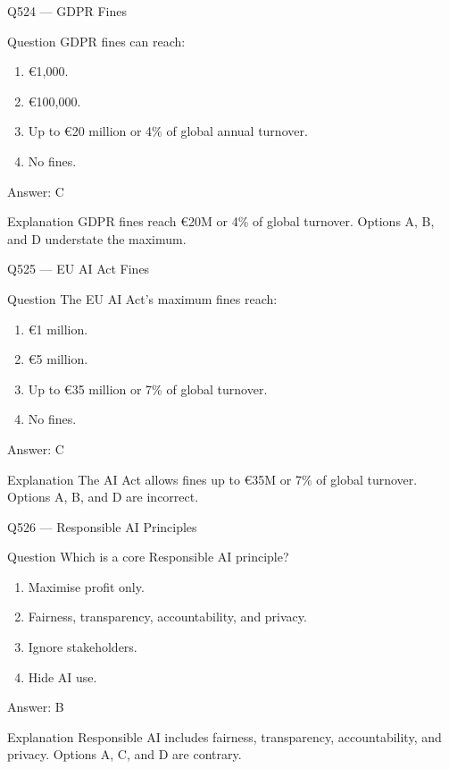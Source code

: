 \documentclass[aspectratio=169,8pt]{beamer}
\begin{document}
	\begin{frame}{Q524 --- GDPR Fines}
		\begin{block}{Question}
			GDPR fines can reach:
			\begin{enumerate}
				\item €1,000.
				\item €100,000.
				\item Up to €20 million or 4\% of global annual turnover.
				\item No fines.
			\end{enumerate}
		\end{block}
		\begin{exampleblock}{Answer: C}\end{exampleblock}
		\begin{block}{Explanation}
			GDPR fines reach €20M or 4\% of global turnover. Options A, B, and D understate the maximum.
		\end{block}
	\end{frame}
	
	\begin{frame}{Q525 --- EU AI Act Fines}
		\begin{block}{Question}
			The EU AI Act's maximum fines reach:
			\begin{enumerate}
				\item €1 million.
				\item €5 million.
				\item Up to €35 million or 7\% of global turnover.
				\item No fines.
			\end{enumerate}
		\end{block}
		\begin{exampleblock}{Answer: C}\end{exampleblock}
		\begin{block}{Explanation}
			The AI Act allows fines up to €35M or 7\% of global turnover. Options A, B, and D are incorrect.
		\end{block}
	\end{frame}
	
	\begin{frame}{Q526 --- Responsible AI Principles}
		\begin{block}{Question}
			Which is a core Responsible AI principle?
			\begin{enumerate}
				\item Maximise profit only.
				\item Fairness, transparency, accountability, and privacy.
				\item Ignore stakeholders.
				\item Hide AI use.
			\end{enumerate}
		\end{block}
		\begin{exampleblock}{Answer: B}\end{exampleblock}
		\begin{block}{Explanation}
			Responsible AI includes fairness, transparency, accountability, and privacy. Options A, C, and D are contrary.
		\end{block}
	\end{frame}
	
\end{document}
